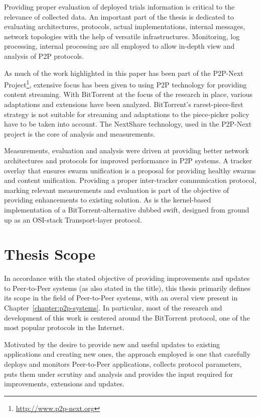 Providing proper evaluation of deployed trials information is critical to the
relevance of collected data. An important part of the thesis is dedicated to
evaluating architectures, protocols, actual implementations, internal
messages, network topologies with the help of versatile infrastructures.
Monitoring, log processing, internal processing are all employed to allow
in-depth view and analysis of P2P protocols.

As much of the work highlighted in this paper has been part of the
P2P-Next Project\footnote{\url{http://www.p2p-next.org}}, extensive focus has been given to using P2P
technology for providing content streaming. With BitTorrent at the focus of
the research in place, various adaptations and extensions have been analyzed.
BitTorrent's rarest-piece-first strategy is not suitable for streaming and
adaptations to the piece-picker policy have to be taken into account. The
NextShare technology, used in the P2P-Next project is the core of analysis and
measurements.

Measurements, evaluation and analysis were driven at providing better network
architectures and protocols for improved performance in P2P systems. A tracker
overlay that ensures swarm unification is a proposal for providing healthy
swarms and content unification. Providing a proper inter-tracker communication
protocol, marking relevant measurements and evaluation is part of the objective
of providing enhancements to existing solution. As is the kernel-based
implementation of a BitTorrent-alternative dubbed swift, designed from ground
up as an OSI-stack Transport-layer protocol.

\section{Thesis Scope}
\label{sec:intro:scope}

In accordance with the stated objective of providing improvements and updates
to Peer-to-Peer systems (as also stated in the title), this thesis primarily
defines its scope in the field of Peer-to-Peer systems, with an overal view
present in Chapter~\ref{chapter:p2p-systems}. In particular, most of
the research and development of this work is centered around the BitTorrent
protocol, one of the most popular protocols in the Internet.

Motivated by the desire to provide new and useful updates to existing
applications and creating new ones, the approach employed is one that
carefully deploys and monitors Peer-to-Peer applications, collects protocol
parameters, puts them under scrutiny and analysis and provides the input
required for improvements, extensions and updates.

